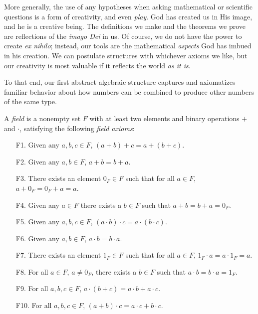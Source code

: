 \documentclass[english,course]{lecture}
\theoremstyle{plain}
\newenvironment{definition}[1]
  {\renewcommand\theinnerdefinition{#1}\innerdefinition}
  {\endinnerdefinition}
\begin{document}
More generally, the use of any hypotheses when asking mathematical or scientific questions is a form of creativity, and even \emph{play}.
God has created us in His image, and he is a creative being.
The definitions we make and the theorems we prove are reflections of the \emph{imago Dei} in us.
Of course, we do not have the power to create \emph{ex nihilo}; instead, our tools are the mathematical \emph{aspects} God has imbued in his creation.
We can postulate structures with whichever axioms we like, but our creativity is most valuable if it reflects the world \emph{as it is}.


To that end, our first abstract algebraic structure captures and axiomatizes familiar behavior about how numbers can be combined to produce other numbers of the same type.



\begin{definition}\label{def:field}
	A \emph{field} is a nonempty set $F$ with at least two elements and binary operations $+$ and $\cdot$, satisfying the following \emph{field axioms}:
	\begin{enumerate}
		\item[F1.] Given any $a,b,c\in F$, $(a+b)+c = a+(b+c)$. %
		\item[F2.] Given any $a,b\in F$, $a+b= b+a$. %
		\item[F3.] There exists an element $0_F\in F$ such that for all $a\in F$, $a+0_F = 0_F + a = a$. %
		\item[F4.] Given any $a\in F$ there exists a $b\in F$ such that $a+b = b + a =0_F$.
		\item[F5.] Given any $a,b,c\in F$, $(a\cdot b)\cdot c = a\cdot (b\cdot c)$.
		\item[F6.] Given any $a,b\in F$, $a\cdot b = b\cdot a$.
		\item[F7.] There exists an element $1_F\in F$ such that for all $a\in F$, $1_F\cdot a = a\cdot 1_F = a$.
		\item[F8.] For all $a\in F$, $a\ne 0_F$, there exists a $b\in F$ such that $a\cdot b = b\cdot a = 1_F$.
		\item[F9.] For all $a,b,c\in F$, $a\cdot (b+c) = a\cdot b + a\cdot c$.
		\item[F10.] For all $a,b,c\in F$, $(a+b)\cdot c = a\cdot c + b\cdot c$.
	\end{enumerate}
\end{definition}
\end{document}
